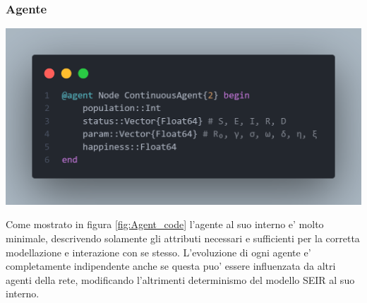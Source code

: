 \subsubsection{Agente}

\begin{minipage}{\linewidth}
    \centering
    \includegraphics[width=\textwidth]{img/node_agent.png}
    \label{fig:Agent_code}
\end{minipage}

Come mostrato in figura \ref{fig:Agent_code} l'agente al suo interno e' molto minimale,
descrivendo solamente gli attributi necessari e sufficienti per la corretta modellazione
e interazione con se stesso. L'evoluzione di ogni agente e' completamente indipendente 
anche se questa puo' essere influenzata da altri agenti della rete, modificando l'altrimenti 
determinismo del modello SEIR al suo interno. 

